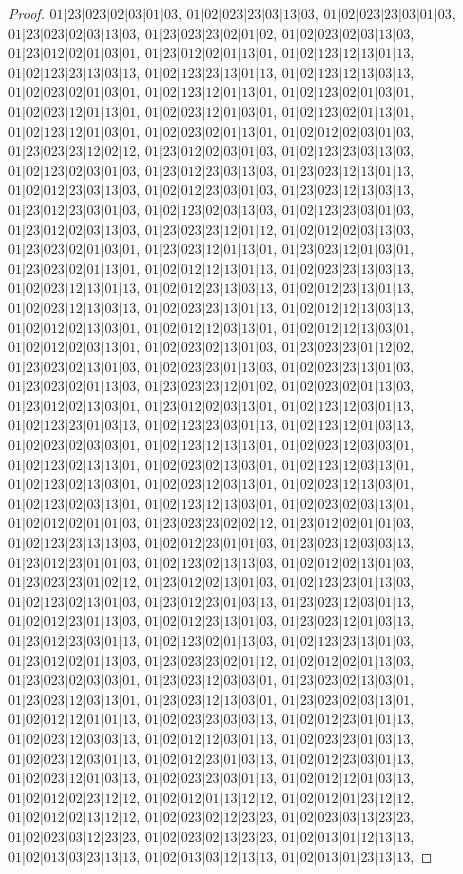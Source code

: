 \documentclass[12pt]{article}
\theoremstyle{plain}
\theoremstyle{definition}
\theoremstyle{remark}
\begin{document}
\begin{proof}
$01|23|023|02|03|01|03$, $01|02|023|23|03|13|03$, $01|02|023|23|03|01|03$, $01|23|023|02|03|13|03$, $01|23|023|23|02|01|02$, $01|02|023|02|03|13|03$, $01|23|012|02|01|03|01$, $01|23|012|02|01|13|01$, $01|02|123|12|13|01|13$, $01|02|123|23|13|03|13$, $01|02|123|23|13|01|13$, $01|02|123|12|13|03|13$, $01|02|023|02|01|03|01$, $01|02|123|12|01|13|01$, $01|02|123|02|01|03|01$, $01|02|023|12|01|13|01$, $01|02|023|12|01|03|01$, $01|02|123|02|01|13|01$, $01|02|123|12|01|03|01$, $01|02|023|02|01|13|01$, $01|02|012|02|03|01|03$, $01|23|023|23|12|02|12$, $01|23|012|02|03|01|03$, $01|02|123|23|03|13|03$, $01|02|123|02|03|01|03$, $01|23|012|23|03|13|03$, $01|23|023|12|13|01|13$, $01|02|012|23|03|13|03$, $01|02|012|23|03|01|03$, $01|23|023|12|13|03|13$, $01|23|012|23|03|01|03$, $01|02|123|02|03|13|03$, $01|02|123|23|03|01|03$, $01|23|012|02|03|13|03$, $01|23|023|23|12|01|12$, $01|02|012|02|03|13|03$, $01|23|023|02|01|03|01$, $01|23|023|12|01|13|01$, $01|23|023|12|01|03|01$, $01|23|023|02|01|13|01$, $01|02|012|12|13|01|13$, $01|02|023|23|13|03|13$, $01|02|023|12|13|01|13$, $01|02|012|23|13|03|13$, $01|02|012|23|13|01|13$, $01|02|023|12|13|03|13$, $01|02|023|23|13|01|13$, $01|02|012|12|13|03|13$, $01|02|012|02|13|03|01$, $01|02|012|12|03|13|01$, $01|02|012|12|13|03|01$, $01|02|012|02|03|13|01$, $01|02|023|02|13|01|03$, $01|23|023|23|01|12|02$, $01|23|023|02|13|01|03$, $01|02|023|23|01|13|03$, $01|02|023|23|13|01|03$, $01|23|023|02|01|13|03$, $01|23|023|23|12|01|02$, $01|02|023|02|01|13|03$, $01|23|012|02|13|03|01$, $01|23|012|02|03|13|01$, $01|02|123|12|03|01|13$, $01|02|123|23|01|03|13$, $01|02|123|23|03|01|13$, $01|02|123|12|01|03|13$, $01|02|023|02|03|03|01$, $01|02|123|12|13|13|01$, $01|02|023|12|03|03|01$, $01|02|123|02|13|13|01$, $01|02|023|02|13|03|01$, $01|02|123|12|03|13|01$, $01|02|123|02|13|03|01$, $01|02|023|12|03|13|01$, $01|02|023|12|13|03|01$, $01|02|123|02|03|13|01$, $01|02|123|12|13|03|01$, $01|02|023|02|03|13|01$, $01|02|012|02|01|01|03$, $01|23|023|23|02|02|12$, $01|23|012|02|01|01|03$, $01|02|123|23|13|13|03$, $01|02|012|23|01|01|03$, $01|23|023|12|03|03|13$, $01|23|012|23|01|01|03$, $01|02|123|02|13|13|03$, $01|02|012|02|13|01|03$, $01|23|023|23|01|02|12$, $01|23|012|02|13|01|03$, $01|02|123|23|01|13|03$, $01|02|123|02|13|01|03$, $01|23|012|23|01|03|13$, $01|23|023|12|03|01|13$, $01|02|012|23|01|13|03$, $01|02|012|23|13|01|03$, $01|23|023|12|01|03|13$, $01|23|012|23|03|01|13$, $01|02|123|02|01|13|03$, $01|02|123|23|13|01|03$, $01|23|012|02|01|13|03$, $01|23|023|23|02|01|12$, $01|02|012|02|01|13|03$, $01|23|023|02|03|03|01$, $01|23|023|12|03|03|01$, $01|23|023|02|13|03|01$, $01|23|023|12|03|13|01$, $01|23|023|12|13|03|01$, $01|23|023|02|03|13|01$, $01|02|012|12|01|01|13$, $01|02|023|23|03|03|13$, $01|02|012|23|01|01|13$, $01|02|023|12|03|03|13$, $01|02|012|12|03|01|13$, $01|02|023|23|01|03|13$, $01|02|023|12|03|01|13$, $01|02|012|23|01|03|13$, $01|02|012|23|03|01|13$, $01|02|023|12|01|03|13$, $01|02|023|23|03|01|13$, $01|02|012|12|01|03|13$, $01|02|012|02|23|12|12$, $01|02|012|01|13|12|12$, $01|02|012|01|23|12|12$, $01|02|012|02|13|12|12$, $01|02|023|02|12|23|23$, $01|02|023|03|13|23|23$, $01|02|023|03|12|23|23$, $01|02|023|02|13|23|23$, $01|02|013|01|12|13|13$, $01|02|013|03|23|13|13$, $01|02|013|03|12|13|13$, $01|02|013|01|23|13|13$, 
\end{proof}
\end{document}
